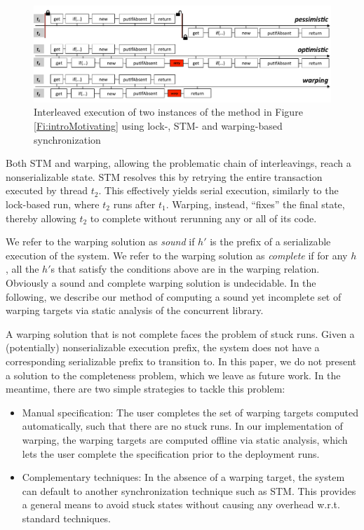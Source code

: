 \begin{figure}
	\begin{center}
	\includegraphics[width=\textwidth]{OverviewSlide.pdf}
	\end{center}
	\caption{\label{Fi:motivatingOverview}Interleaved execution of two instances of the method in Figure \ref{Fi:introMotivating} using lock-, STM- and warping-based synchronization}
\end{figure}

Both STM and warping, allowing the problematic chain of interleavings, reach a nonserializable state. STM resolves this by retrying the entire transaction executed by thread $t_2$. This effectively yields serial execution, similarly to the lock-based run, where $t_2$ runs after $t_1$. Warping, instead, ``fixes'' the final state, thereby allowing $t_2$ to complete without rerunning any or all of its code.

We refer to the warping solution as \emph{sound} if $h'$ is the prefix of a serializable execution of the system. We refer to the warping solution as \emph{complete} if for any $h$, all the $h'$s that satisfy the conditions above are in the warping relation. Obviously a sound and complete warping solution is undecidable. In the following, we describe our method of computing a sound yet incomplete set of warping targets via static analysis of the concurrent library.

A warping solution that is not complete faces the problem of stuck runs. Given a (potentially) nonserializable execution prefix, the system does not have a corresponding serializable prefix to transition to. In this paper, we do not present a solution to the completeness problem, which we leave as future work. In the meantime, there are two simple strategies to tackle this problem:
\begin{itemize}
	\item Manual specification: The user completes the set of warping targets computed automatically, such that there are no stuck runs. In our implementation of warping, the warping targets are computed offline via static analysis, which lets the user complete the specification prior to the deployment runs.
	\item Complementary techniques: In the absence of a warping target, the system can default to another synchronization technique such as STM. This provides a general means to avoid stuck states without causing any overhead w.r.t. standard techniques.
\end{itemize}


